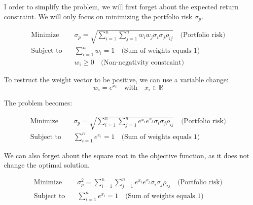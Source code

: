 \documentclass[12pt]{article}
\begin{document}

I order to simplify the problem, we will first forget about the expected return constraint. We will only focus on minimizing the portfolio risk $\sigma_p$.

\begin{equation}
    \begin{aligned}
        \text{Minimize} \quad   & \sigma_p = \sqrt{\sum_{i=1}^{n}\sum_{j=1}^{n} w_i w_j \sigma_i \sigma_j \rho_{ij}} \quad \text{(Portfolio risk)} \\
        \text{Subject to} \quad & \sum_{i=1}^{n} w_i = 1 \quad \text{(Sum of weights equals 1)}                                                        \\
                                & w_i \geq 0 \quad \text{(Non-negativity constraint)}
    \end{aligned}
\end{equation}


To restruct the weight vector to be positive, we can use a variable change:
\begin{equation}
    w_i = e^{x_i} \quad \text{with} \quad x_i \in \mathbb{R}
\end{equation}

The problem becomes:

\begin{equation}
    \begin{aligned}
        \text{Minimize} \quad   & \sigma_p = \sqrt{\sum_{i=1}^{n}\sum_{j=1}^{n} e^{x_i} e^{x_j} \sigma_i \sigma_j \rho_{ij}} \quad \text{(Portfolio risk)} \\
        \text{Subject to} \quad & \sum_{i=1}^{n} e^{x_i} = 1 \quad \text{(Sum of weights equals 1)}    
    \end{aligned}
\end{equation}

We can also forget about the square root in the objective function, as it does not change the optimal solution.

\begin{equation}
    \begin{aligned}
        \text{Minimize} \quad   & \sigma_p^2 = \sum_{i=1}^{n}\sum_{j=1}^{n} e^{x_i} e^{x_j}\sigma_i \sigma_j \rho_{ij} \quad \text{(Portfolio risk)} \\
        \text{Subject to} \quad & \sum_{i=1}^{n} e^{x_i} = 1 \quad \text{(Sum of weights equals 1)}    
    \end{aligned}
\end{equation}
\end{document}
